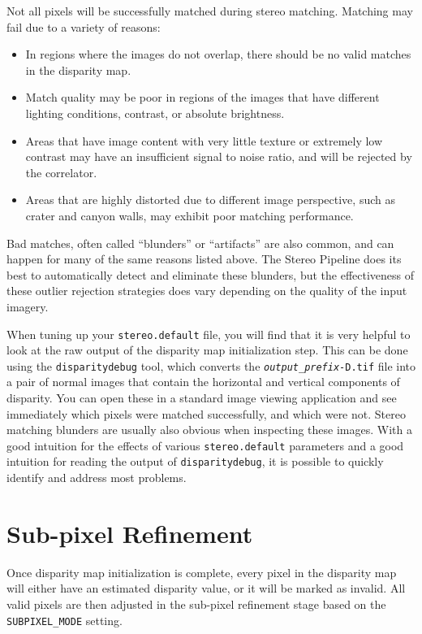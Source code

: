 Not all pixels will be successfully matched during stereo matching.
Matching may fail due to a variety of reasons:

\begin{itemize}
\item In regions where the images do not overlap, there should be no
  valid matches in the disparity map.
\item Match quality may be poor in regions of the images that have
  different lighting conditions, contrast, or absolute brightness.  
\item Areas that have image content with very little texture or
  extremely low contrast may have an insufficient signal to noise
  ratio, and will be rejected by the correlator.
\item Areas that are highly distorted due to different image
  perspective, such as crater and canyon walls, may exhibit poor
  matching performance.
\end{itemize}

Bad matches, often called ``blunders'' or ``artifacts'' are also
common, and can happen for many of the same reasons listed above.  The
Stereo Pipeline does its best to automatically detect and eliminate
these blunders, but the effectiveness of these outlier rejection
strategies does vary depending on the quality of the input imagery.

When tuning up your {\tt stereo.default} file, you will find that
it is very helpful to look at the raw output of the disparity map
initialization step.  This can be done using the {\tt disparitydebug}
tool, which converts the \texttt{\textit{output\_prefix}-D.tif}
file into a pair of normal images that contain the horizontal and
vertical components of disparity.  You can open these in a standard
image viewing application and see immediately which pixels were
matched successfully, and which were not.  Stereo matching blunders
are usually also obvious when inspecting these images.  With a good
intuition for the effects of various {\tt stereo.default} parameters
and a good intuition for reading the output of {\tt disparitydebug},
it is possible to quickly identify and address most problems.

\section{Sub-pixel Refinement}
\label{sec:subpixel}

Once disparity map initialization is complete, every pixel in the
disparity map will either have an estimated disparity value, or it
will be marked as invalid.  All valid pixels are then adjusted in the
sub-pixel refinement stage based on the \texttt{SUBPIXEL\_MODE} setting.

